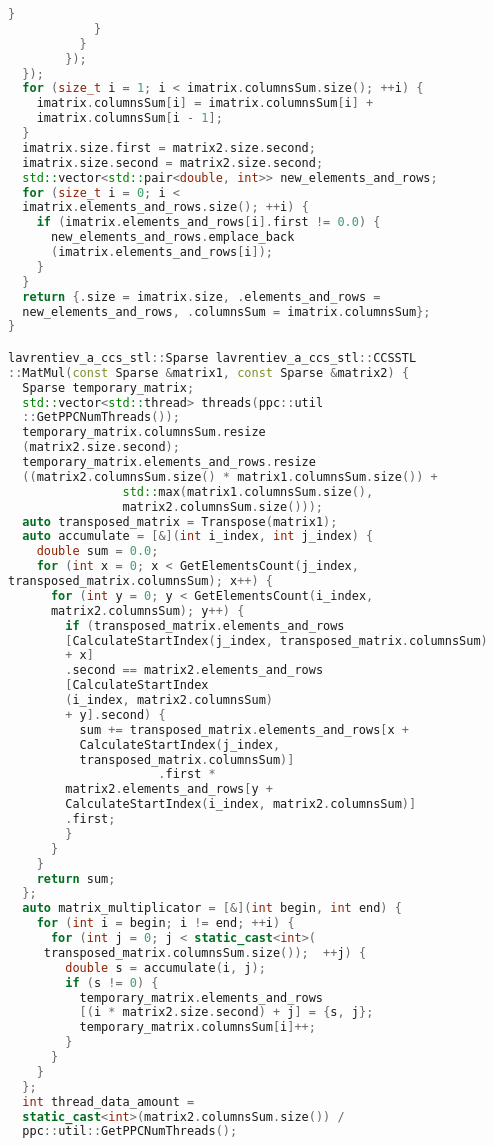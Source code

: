 \documentclass[12pt]{article}
\begin{document}
\begin{lstlisting}[language=C++]
              }
            }
          }
        });
  });
  for (size_t i = 1; i < imatrix.columnsSum.size(); ++i) {
    imatrix.columnsSum[i] = imatrix.columnsSum[i] + 
    imatrix.columnsSum[i - 1];
  }
  imatrix.size.first = matrix2.size.second;
  imatrix.size.second = matrix2.size.second;
  std::vector<std::pair<double, int>> new_elements_and_rows;
  for (size_t i = 0; i < 
  imatrix.elements_and_rows.size(); ++i) {
    if (imatrix.elements_and_rows[i].first != 0.0) {
      new_elements_and_rows.emplace_back
      (imatrix.elements_and_rows[i]);
    }
  }
  return {.size = imatrix.size, .elements_and_rows =
  new_elements_and_rows, .columnsSum = imatrix.columnsSum};
}

lavrentiev_a_ccs_stl::Sparse lavrentiev_a_ccs_stl::CCSSTL
::MatMul(const Sparse &matrix1, const Sparse &matrix2) {
  Sparse temporary_matrix;
  std::vector<std::thread> threads(ppc::util
  ::GetPPCNumThreads());
  temporary_matrix.columnsSum.resize
  (matrix2.size.second);
  temporary_matrix.elements_and_rows.resize
  ((matrix2.columnsSum.size() * matrix1.columnsSum.size()) +
                std::max(matrix1.columnsSum.size(), 
                matrix2.columnsSum.size()));
  auto transposed_matrix = Transpose(matrix1);
  auto accumulate = [&](int i_index, int j_index) {
    double sum = 0.0;
    for (int x = 0; x < GetElementsCount(j_index, 
transposed_matrix.columnsSum); x++) {
      for (int y = 0; y < GetElementsCount(i_index, 
      matrix2.columnsSum); y++) {
        if (transposed_matrix.elements_and_rows
        [CalculateStartIndex(j_index, transposed_matrix.columnsSum)
        + x]
        .second == matrix2.elements_and_rows
        [CalculateStartIndex
        (i_index, matrix2.columnsSum)
        + y].second) {
          sum += transposed_matrix.elements_and_rows[x + 
          CalculateStartIndex(j_index, 
          transposed_matrix.columnsSum)]
                     .first *
        matrix2.elements_and_rows[y + 
        CalculateStartIndex(i_index, matrix2.columnsSum)]
        .first;
        }
      }
    }
    return sum;
  };
  auto matrix_multiplicator = [&](int begin, int end) {
    for (int i = begin; i != end; ++i) {
      for (int j = 0; j < static_cast<int>(
     transposed_matrix.columnsSum.size());  ++j) {
        double s = accumulate(i, j);
        if (s != 0) {
          temporary_matrix.elements_and_rows
          [(i * matrix2.size.second) + j] = {s, j};
          temporary_matrix.columnsSum[i]++;
        }
      }
    }
  };
  int thread_data_amount = 
  static_cast<int>(matrix2.columnsSum.size()) / 
  ppc::util::GetPPCNumThreads();

\end{lstlisting}
\end{document}
